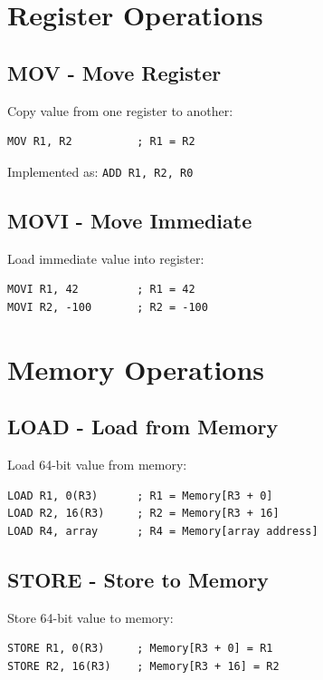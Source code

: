 \documentclass[12pt,a4paper,oneside]{book}
\begin{document}
\section{Register Operations}

\subsection{MOV - Move Register}

Copy value from one register to another:

\begin{lstlisting}[style=assembly]
MOV R1, R2          ; R1 = R2
\end{lstlisting}

Implemented as: \texttt{ADD R1, R2, R0}

\subsection{MOVI - Move Immediate}

Load immediate value into register:

\begin{lstlisting}[style=assembly]
MOVI R1, 42         ; R1 = 42
MOVI R2, -100       ; R2 = -100
\end{lstlisting}

\section{Memory Operations}

\subsection{LOAD - Load from Memory}

Load 64-bit value from memory:

\begin{lstlisting}[style=assembly]
LOAD R1, 0(R3)      ; R1 = Memory[R3 + 0]
LOAD R2, 16(R3)     ; R2 = Memory[R3 + 16]
LOAD R4, array      ; R4 = Memory[array address]
\end{lstlisting}

\subsection{STORE - Store to Memory}

Store 64-bit value to memory:

\begin{lstlisting}[style=assembly]
STORE R1, 0(R3)     ; Memory[R3 + 0] = R1
STORE R2, 16(R3)    ; Memory[R3 + 16] = R2
\end{lstlisting}
\end{document}
